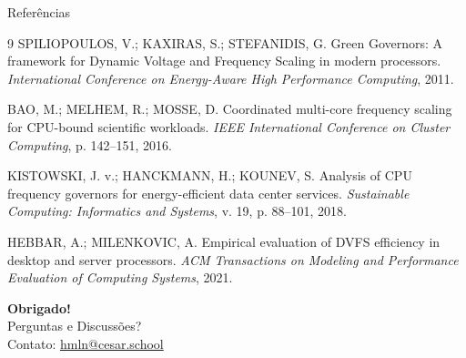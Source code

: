 \documentclass[aspectratio=169,10pt]{beamer}
\begin{document}
\begin{frame}[allowframebreaks]{Referências}
    \footnotesize
    \begin{thebibliography}{9}
        SPILIOPOULOS, V.; KAXIRAS, S.; STEFANIDIS, G. Green Governors: A framework for Dynamic Voltage and Frequency Scaling in modern processors. \textit{International Conference on Energy-Aware High Performance Computing}, 2011.

        BAO, M.; MELHEM, R.; MOSSE, D. Coordinated multi-core frequency scaling for CPU-bound scientific workloads. \textit{IEEE International Conference on Cluster Computing}, p. 142--151, 2016.

        KISTOWSKI, J. v.; HANCKMANN, H.; KOUNEV, S. Analysis of CPU frequency governors for energy-efficient data center services. \textit{Sustainable Computing: Informatics and Systems}, v. 19, p. 88--101, 2018.

        HEBBAR, A.; MILENKOVIC, A. Empirical evaluation of DVFS efficiency in desktop and server processors. \textit{ACM Transactions on Modeling and Performance Evaluation of Computing Systems}, 2021.
    \end{thebibliography}
\end{frame}

\begin{frame}
    \begin{center}
        {\Huge \textbf{Obrigado!}} \\[1em]
        {\large Perguntas e Discussões?} \\[1.5em]
        \small Contato: \url{hmln@cesar.school}
    \end{center}
\end{frame}
\end{document}

